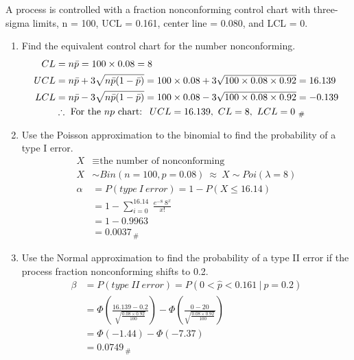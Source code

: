 A process is controlled with a fraction nonconforming control chart with three-sigma limits, n = 100, UCL = 0.161, center line = 0.080, and LCL = 0.

\begin{enumerate}
    \item Find the equivalent control chart for the number nonconforming.
        \begin{align*}
            CL &= n\Bar{p} = 100 \times 0.08 = 8\\
            UCL &= n\Bar{p} + 3\sqrt{n\Bar{p}(1 - \Bar{p})} 
            = 100 \times 0.08 + 3\sqrt{100 \times 0.08 \times 0.92}
            = 16.139\\
            LCL &= n\Bar{p} - 3\sqrt{n\Bar{p}(1 - \Bar{p})} 
            = 100 \times 0.08 - 3\sqrt{100 \times 0.08 \times 0.92}
            = -0.139\\
            &\therefore \ \text{For the $np$ chart: } \ UCL = 16.139, \ CL = 8, \ LCL = 0_{\ \#}
        \end{align*}

    \item Use the Poisson approximation to the binomial to find the probability of a type I error.
        \begin{align*}
            X &\equiv \text{the number of nonconforming}\\
            X &\sim Bin(n = 100, p = 0.08) \ \approx \ X \sim Poi(\lambda = 8)\\
            \alpha &= P\left(type \ I \ error \right) = 1 - P\left(X \leq 16.14 \right)\\
            &= 1 - \sum_{i = 0}^{16.14} \ \frac{e^{-8} \ 8^x}{x!}\\
            &= 1 - 0.9963\\
            &= 0.0037_{\ \#}
        \end{align*}
        
    \item Use the Normal approximation to find the probability of a type II error if the process fraction nonconforming shifts to 0.2.
        \begin{align*}
            \beta &= P\left(type \ II \ error \right) = P\left(0 < \hat{p} < 0.161 \ | \ p = 0.2 \right)\\
            &= \Phi \left(\frac{16.139 - 0.2}{\sqrt{\frac{0.08 \times 0.92}{100}}} \right) - \Phi \left(\frac{0 - 20}{\sqrt{\frac{0.08 \times 0.92}{100}}} \right)\\
            &= \Phi(-1.44) - \Phi(-7.37)\\
            &= 0.0749_{\ \#}
        \end{align*}
        

\end{enumerate}
